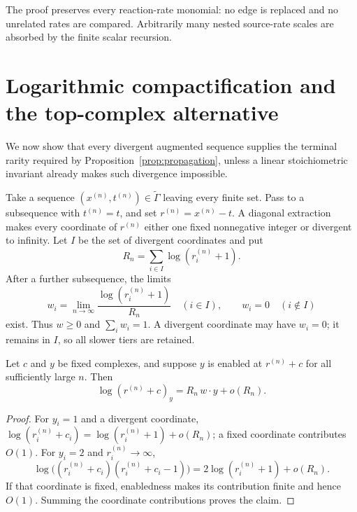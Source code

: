 The proof preserves every reaction-rate monomial: no edge is replaced and no
unrelated rates are compared.  Arbitrarily many nested source-rate scales are
absorbed by the finite scalar recursion.

\section{Logarithmic compactification and the top-complex alternative}
\label{sec:compact}

We now show that every divergent augmented sequence supplies the terminal
rarity required by Proposition~\ref{prop:propagation}, unless a linear
stoichiometric invariant already makes such divergence impossible.

Take a sequence \((x^{(n)},t^{(n)})\in\widetilde\Gamma\) leaving every finite
set.  Pass to a subsequence with \(t^{(n)}=t\), and set
\(r^{(n)}=x^{(n)}-t\).  A diagonal extraction makes every coordinate of
\(r^{(n)}\) either one fixed nonnegative integer or divergent to infinity.
Let \(I\) be the set of divergent coordinates and put
\begin{equation}\label{eq:Rn}
  R_n=\sum_{i\in I}\log(r_i^{(n)}+1).
\end{equation}
After a further subsequence, the limits
\begin{equation}\label{eq:weights}
  w_i=\lim_{n\to\infty}
  \frac{\log(r_i^{(n)}+1)}{R_n}
  \quad(i\in I),
  \qquad w_i=0\quad(i\notin I)
\end{equation}
exist.  Thus \(w\ge0\) and \(\sum_iw_i=1\).  A divergent coordinate may
have \(w_i=0\); it remains in \(I\), so all slower tiers are retained.

\begin{lemma}\label{lem:ff-asymptotic}
Let \(c\) and \(y\) be fixed complexes, and suppose \(y\) is enabled at
\(r^{(n)}+c\) for all sufficiently large \(n\).  Then
\begin{equation}\label{eq:ff-asymptotic}
  \log(r^{(n)}+c)_y=R_n\,w\cdot y+o(R_n).
\end{equation}
\end{lemma}

\begin{proof}
For \(y_i=1\) and a divergent coordinate,
\(\log(r_i^{(n)}+c_i)=\log(r_i^{(n)}+1)+o(R_n)\); a fixed coordinate
contributes \(O(1)\).  For \(y_i=2\) and \(r_i^{(n)}\to\infty\),
\[
 \log\bigl((r_i^{(n)}+c_i)(r_i^{(n)}+c_i-1)\bigr)
 =2\log(r_i^{(n)}+1)+o(R_n).
\]
If that coordinate is fixed, enabledness makes its contribution finite and
hence \(O(1)\).  Summing the coordinate contributions proves the claim.
\end{proof}

